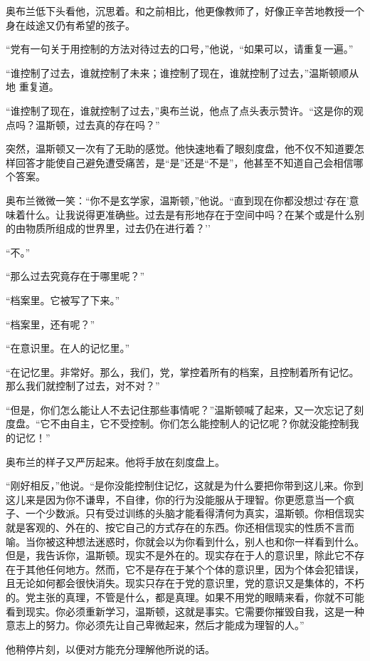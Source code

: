 奥布兰低下头看他，沉思着。和之前相比，他更像教师了，好像正辛苦地教授一个身在歧途又仍有希望的孩子。

``党有一句关于用控制的方法对待过去的口号，''他说，``如果可以，请重复一遍。''

``谁控制了过去，谁就控制了未来；谁控制了现在，谁就控制了过去，''温斯顿顺从地
重复道。

``谁控制了现在，谁就控制了过去，''奥布兰说，他点了点头表示赞许。``这是你的观点吗？温斯顿，过去真的存在吗？''

突然，温斯顿又一次有了无助的感觉。他快速地看了眼刻度盘，他不仅不知道要怎样回答才能使自己避免遭受痛苦，是``是''还是``不是''，他甚至不知道自己会相信哪个答案。

奥布兰微微一笑：``你不是玄学家，温斯顿，''他说。``直到现在你都没想过`存在'意味着什么。让我说得更准确些。过去是有形地存在于空间中吗？在某个或是什么别的由物质所组成的世界里，过去仍在进行着？''

``不。''

``那么过去究竟存在于哪里呢？''

``档案里。它被写了下来。''

``档案里，还有呢？''

``在意识里。在人的记忆里。''

``在记忆里。非常好。那么，我们，党，掌控着所有的档案，且控制着所有记忆。那么我们就控制了过去，对不对？''

``但是，你们怎么能让人不去记住那些事情呢？''温斯顿喊了起来，又一次忘记了刻度盘。``它不由自主，它不受控制。你们怎么能控制人的记忆呢？你就没能控制我的记忆！''

奥布兰的样子又严厉起来。他将手放在刻度盘上。

``刚好相反，''他说。``是你没能控制住记忆，这就是为什么要把你带到这儿来。你到这儿来是因为你不谦卑，不自律，你的行为没能服从于理智。你更愿意当一个疯子、一个少数派。只有受过训练的头脑才能看得清何为真实，温斯顿。你相信现实就是客观的、外在的、按它自己的方式存在的东西。你还相信现实的性质不言而喻。当你被这种想法迷惑时，你就会以为你看到什么，别人也和你一样看到什么。但是，我告诉你，温斯顿。现实不是外在的。现实存在于人的意识里，除此它不存在于其他任何地方。然而，它不是存在于某个个体的意识里，因为个体会犯错误，且无论如何都会很快消失。现实只存在于党的意识里，党的意识又是集体的，不朽的。党主张的真理，不管是什么，都是真理。如果不用党的眼睛来看，你就不可能看到现实。你必须重新学习，温斯顿，这就是事实。它需要你摧毁自我，这是一种意志上的努力。你必须先让自己卑微起来，然后才能成为理智的人。''

他稍停片刻，以便对方能充分理解他所说的话。

